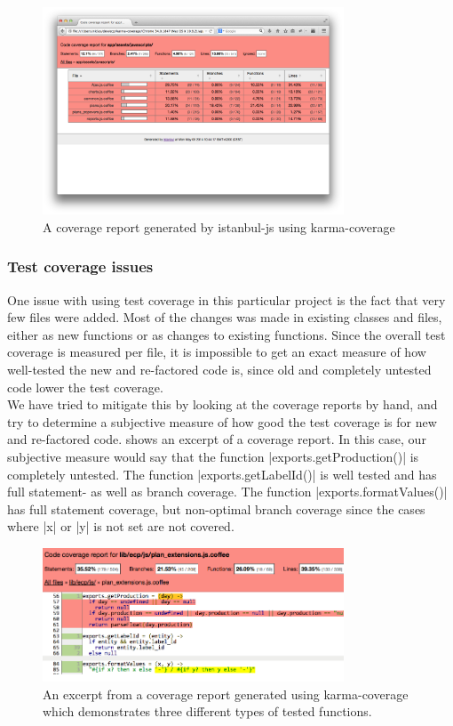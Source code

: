 \begin{figure}
\centering
\includegraphics[width=0.8\textwidth]{methodology/karma_coverage}
\caption{A coverage report generated by istanbul-js using karma-coverage}
\label{fig:karma_report}
\end{figure}

\subsubsection{Test coverage issues}

One issue with using test coverage in this particular project is the
fact that very few files were added. Most of the changes was made in
existing classes and files, either as new functions or as changes to
existing functions. Since the overall test coverage is measured per
file, it is impossible to get an exact measure of how well-tested the
new and re-factored code is, since old and completely untested code
lower the test coverage.\\

We have tried to mitigate this by looking at the coverage reports by
hand, and try to determine a subjective measure of how good the test
coverage is for new and re-factored code. 
shows an excerpt of a coverage report. In this case, our subjective
measure would say that the function |exports.getProduction()| is
completely untested. The function |exports.getLabelId()| is well tested
and has full statement- as well as branch coverage. The function
|exports.formatValues()| has full statement coverage, but non-optimal
branch coverage since the cases where |x| or |y| is not set are not
covered.\\

\begin{figure}
\centering
\includegraphics[width=0.8\textwidth]{results/js_coverage}
\caption{An excerpt from a coverage report generated using karma-coverage
         which demonstrates three different types of tested functions.}
\label{fig:coverage_example}
\end{figure}

